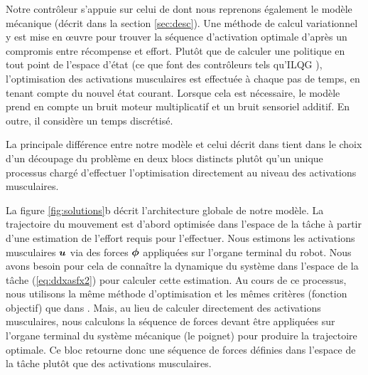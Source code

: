 \documentclass[pdftex,a4paper,11pt]{article}
\begin{document}
Notre contrôleur s'appuie sur celui de \cite{rigoux11} dont nous reprenons
éga\-le\-ment le modèle mécanique (décrit dans la section \ref{sec:desc}).
Une méthode de calcul variationnel y est mise en œuvre pour trouver la séquence
d'activation optimale d'après un compromis entre récompense et effort.
Plutôt que de calculer une politique en tout point de l'espace d'état (ce que
font des contrôleurs tels qu'ILQG \cite{todorov05_ACC}), l'optimisation des
activations musculaires est effectuée à chaque pas de temps, en tenant compte
du nouvel état courant.
Lorsque cela est nécessaire, le modèle prend en compte un bruit moteur
multiplicatif et un bruit sensoriel additif. En outre, il considère un temps
discrétisé.

La principale différence entre notre modèle et celui décrit dans
\cite{rigoux11} tient dans le choix d'un découpage du problème en deux
blocs distincts plutôt qu'un unique processus chargé d'effectuer l'optimisation directement au niveau
des activations musculaires.

%    

La figure \ref{fig:solutions}b décrit l'architecture globale de notre modèle.
La trajectoire du mouvement est d'abord optimisée dans l'espace de la tâche à
partir d'une estimation de l'effort requis pour l'effectuer.
Nous estimons les activations musculaires $\boldsymbol{u}$ via des forces
$\boldsymbol{\phi}$ appliquées sur l'organe terminal du robot.
Nous avons besoin pour cela de connaître la dynamique du système dans l'espace de la
tâche (\ref{eq:ddxasfx2}) pour calculer cette estimation. 
Au cours de ce processus, nous utilisons la même méthode d'optimisation et les mêmes
critères (fonction objectif) que dans \cite{rigoux11}. Mais, au lieu de calculer directement des activations musculaires, nous calculons
la séquence de forces devant être appliquées sur l'organe
terminal du système mécanique (le poignet) pour produire la trajectoire
optimale.  Ce bloc retourne donc une séquence de forces définies dans
l'espace de la tâche plutôt que des activations musculaires.
\end{document}
